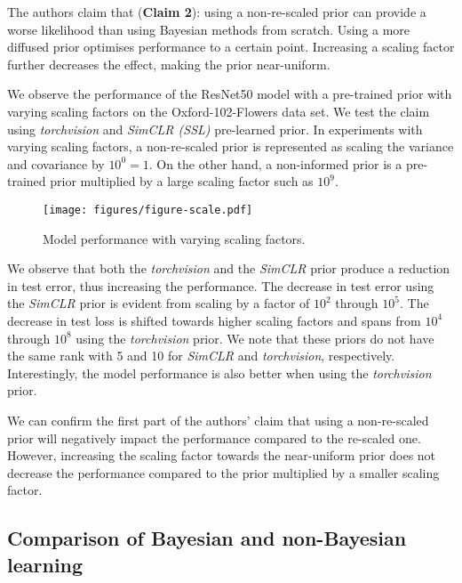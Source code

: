 The authors claim that (\textbf{Claim 2}): using a non-re-scaled prior can provide a worse likelihood than using Bayesian methods from scratch. Using a more diffused prior optimises performance to a certain point. Increasing a scaling factor further decreases the effect, making the prior near-uniform.

We observe the performance of the ResNet50 model with a pre-trained prior with varying scaling factors on the Oxford-102-Flowers data set.
We test the claim using \textit{torchvision} and \textit{SimCLR (SSL)} pre-learned prior.
In experiments with varying scaling factors, a non-re-scaled prior is represented as scaling the variance and covariance by $10^0 = 1$. On the other hand, a non-informed prior is a pre-trained prior multiplied by a large scaling factor such as $10^9$.

\begin{figure}[ht]
    \centering
    \texttt{[image: figures/figure-scale.pdf]}
    \caption{Model performance with varying scaling factors.}
    \label{fig:scaling}
\end{figure}

We observe that both the \textit{torchvision} and the \textit{SimCLR} prior produce a reduction in test error, thus increasing the performance.
The decrease in test error using the \textit{SimCLR} prior is evident from scaling by a factor of $10^2$ through $10^5$. The decrease in test loss is shifted towards higher scaling factors and spans from $10^4$ through $10^8$ using the \textit{torchvision} prior. We note that these priors do not have the same rank with 5 and 10 for \textit{SimCLR} and \textit{torchvision}, respectively. Interestingly, the model performance is also better when using the \textit{torchvision} prior.

We can confirm the first part of the authors' claim that using a non-re-scaled prior will negatively impact the performance compared to the re-scaled one. %
However, increasing the scaling factor towards the near-uniform prior does not decrease the performance compared to the prior multiplied by a smaller scaling factor. 

\subsection{Comparison of Bayesian and non-Bayesian learning}

